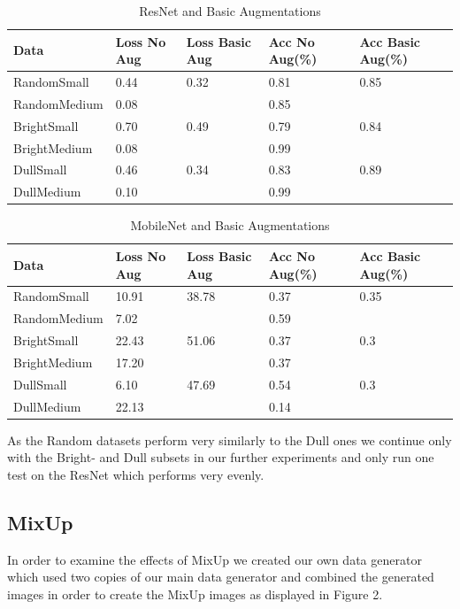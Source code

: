 \documentclass{article}
\begin{document}
\begin{table}[H]
	\caption{ResNet and Basic Augmentations}
	\label{sample-table}
	\centering
	\begin{tabular}{lllll}
		\toprule
		Data & Loss No Aug & Loss Basic Aug & Acc No Aug(\%)& Acc Basic Aug(\%) \\
		\midrule
		RandomSmall  & 0.44 & 0.32& 0.81 & 0.85 \\
		RandomMedium & 0.08 &     & 0.85 &      \\
		BrightSmall  & 0.70 & 0.49& 0.79 & 0.84 \\
		BrightMedium & 0.08 &     & 0.99 &      \\
		DullSmall    & 0.46 & 0.34& 0.83 & 0.89 \\
		DullMedium   & 0.10 &     & 0.99 &      \\
		\bottomrule
	\end{tabular}
\end{table}



\begin{table}[H]
	\caption{MobileNet and Basic Augmentations}
	\label{sample-table}
	\centering
	\begin{tabular}{lllll}
		\toprule
		Data & Loss No Aug & Loss Basic Aug & Acc No Aug(\%)& Acc Basic Aug(\%) \\
		\midrule
		RandomSmall  & 10.91&38.78& 0.37 &0.35  \\
		RandomMedium & 7.02 &     & 0.59 &      \\
		BrightSmall  & 22.43&51.06& 0.37 &0.3   \\
		BrightMedium & 17.20&     & 0.37 &      \\
		DullSmall    & 6.10 &47.69& 0.54 &0.3   \\
		DullMedium   & 22.13&     & 0.14 &      \\
		\bottomrule
	\end{tabular}
\end{table}

As the Random datasets perform very similarly to the Dull ones we continue only with the Bright- and Dull subsets in our further experiments and only run one test on the ResNet which performs very evenly. 

\subsection{MixUp}

In order to examine the effects of MixUp we created our own data generator which used two copies of our main data generator and combined the generated images in order to create the MixUp images as displayed in Figure 2.
\end{document}
